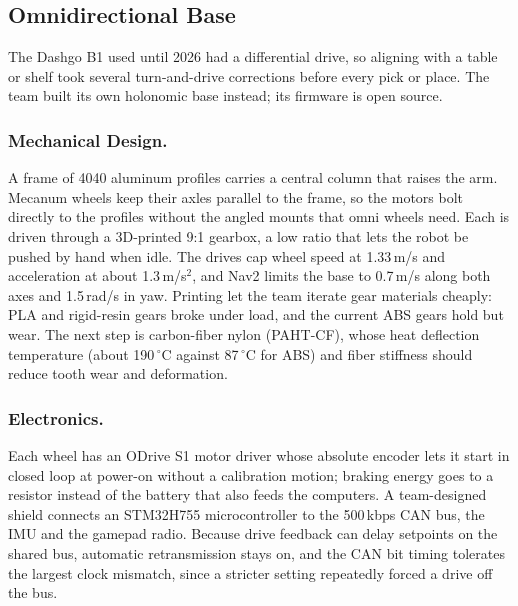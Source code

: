 \subsection{Omnidirectional Base}\label{sec:omnibase}
The Dashgo B1 used until 2026 had a differential drive, so aligning with a table or shelf took several turn-and-drive corrections before every pick or place. The team built its own holonomic base instead; its firmware is open source.

\subsubsection{Mechanical Design.}
A frame of 4040 aluminum profiles carries a central column that raises the arm. Mecanum wheels keep their axles parallel to the frame, so the motors bolt directly to the profiles without the angled mounts that omni wheels need. Each is driven through a 3D-printed 9:1 gearbox, a low ratio that lets the robot be pushed by hand when idle. The drives cap wheel speed at 1.33\,m/s and acceleration at about 1.3\,m/s$^2$, and Nav2 limits the base to 0.7\,m/s along both axes and 1.5\,rad/s in yaw. Printing let the team iterate gear materials cheaply: PLA and rigid-resin gears broke under load, and the current ABS gears hold but wear. The next step is carbon-fiber nylon (PAHT-CF), whose heat deflection temperature (about 190\,$^\circ$C against 87\,$^\circ$C for ABS) and fiber stiffness should reduce tooth wear and deformation.

\subsubsection{Electronics.}
Each wheel has an ODrive S1 motor driver whose absolute encoder lets it start in closed loop at power-on without a calibration motion; braking energy goes to a resistor instead of the battery that also feeds the computers. A team-designed shield connects an STM32H755 microcontroller to the 500\,kbps CAN bus, the IMU and the gamepad radio. Because drive feedback can delay setpoints on the shared bus, automatic retransmission stays on, and the CAN bit timing tolerates the largest clock mismatch, since a stricter setting repeatedly forced a drive off the bus.

